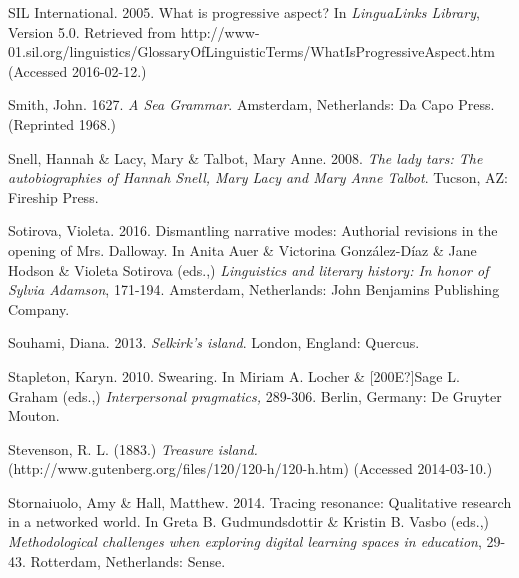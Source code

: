 \begin{styleStandard}
SIL International. 2005. What is progressive aspect? In \textit{LinguaLinks Library}, Version 5.0. Retrieved from http://www-01.sil.org/linguistics/GlossaryOfLinguisticTerms/WhatIsProgressiveAspect.htm (Accessed 2016-02-12.)
\end{styleStandard}

\begin{styleStandard}
Smith, John. 1627. \textit{A Sea Grammar}. Amsterdam, Netherlands: Da Capo Press. (Reprinted 1968.) 
\end{styleStandard}

\begin{styleStandard}
Snell, Hannah \& Lacy, Mary \& Talbot, Mary Anne. 2008. \textit{The lady tars: The autobiographies of Hannah Snell, Mary Lacy and Mary Anne Talbot}. Tucson, AZ: Fireship Press. 
\end{styleStandard}

\begin{styleStandard}
Sotirova, Violeta. 2016. Dismantling narrative modes: Authorial revisions in the opening of Mrs. Dalloway. In Anita Auer \& Victorina González-Díaz \& Jane Hodson \& Violeta Sotirova (eds.,) \textit{Linguistics and literary history: In honor of Sylvia Adamson}, 171-194. Amsterdam, Netherlands: John Benjamins Publishing Company.
\end{styleStandard}

\begin{styleStandard}
Souhami, Diana. 2013. \textit{Selkirk’s island}. London, England: Quercus.
\end{styleStandard}

\begin{styleStandard}
Stapleton, Karyn. 2010. Swearing. In Miriam A. Locher \& [200E?]Sage L. Graham (eds.,) \textit{Interpersonal pragmatics, }289-306.\textit{ }Berlin, Germany: De Gruyter Mouton.
\end{styleStandard}

\begin{styleStandard}
Stevenson, R. L. (1883.) \textit{Treasure island. }(http://www.gutenberg.org/files/120/120-h/120-h.htm) (Accessed 2014-03-10.)
\end{styleStandard}

\begin{styleStandard}
Stornaiuolo, Amy \& Hall, Matthew. 2014. Tracing resonance: Qualitative research in a networked world. In Greta B. Gudmundsdottir \& Kristin B. Vasbo (eds.,) \textit{Methodological challenges when exploring digital learning spaces in education}, 29-43. Rotterdam, Netherlands: Sense.
\end{styleStandard}

